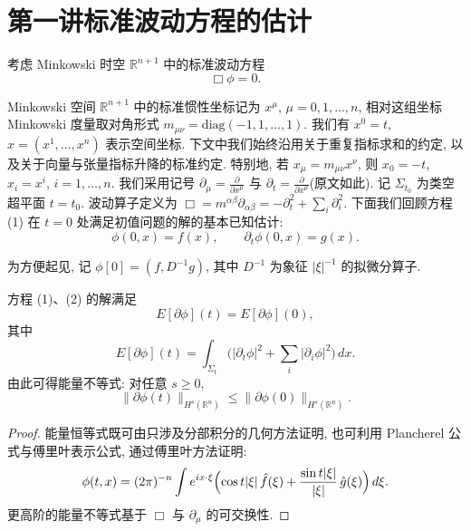 \chapter{第一讲\quad 标准波动方程的估计}

考虑 Minkowski 时空 $\mathbb{R}^{n+1}$ 中的标准波动方程
\begin{equation}
\Box\phi=0.\end{equation}

Minkowski 空间 $\mathbb{R}^{n+1}$ 中的标准惯性坐标记为 $x^\mu$, $\mu = 0,1,\ldots,n$, 相对这组坐标 Minkowski 度量取对角形式 $m_{\mu\nu}= \mathrm{diag}(-1,1,\ldots,1)$. 我们有 $x^0 = t$, $x = (x^1,\ldots,x^n)$ 表示空间坐标. 下文中我们始终沿用关于重复指标求和的约定, 以及关于向量与张量指标升降的标准约定. 特别地, 若 $x_\mu = m_{\mu\nu}x^\nu$, 则 $x_0 = -t$, $x_i = x^i$, $i = 1,\ldots,n$. 我们采用记号 $\partial_\mu = \frac{\partial}{\partial x^\mu}$ 与 $\partial_t = \frac{\partial}{\partial x^\mu}$(原文如此). 记 $\Sigma_{t_0}$ 为类空超平面 $t = t_0$. 波动算子定义为 $\Box = m^{\alpha\beta}\partial_{\alpha\beta} = -\partial_t^2 + \sum_i\partial_i^2$.
下面我们回顾方程 (1) 在 $t=0$ 处满足初值问题的解的基本已知估计:
\begin{equation}
\phi(0,x)=f(x),\qquad \partial_{t}\phi(0,x)=g(x).\end{equation}

为方便起见, 记 $\phi[0] = (f, D^{-1}g)$, 其中 $D^{-1}$ 为象征 $|\xi|^{-1}$ 的拟微分算子.
\begin{proposition}\label{prop:1.1}
方程 (1)、(2) 的解满足
\begin{equation}
E[\partial\phi](t)=E[\partial\phi](0),\end{equation}
其中
\begin{equation}
E[\partial\phi](t)=\int_{\Sigma_{t}}\bigl(|\partial_{t}\phi|^{2}+\sum_{i}|\partial_{i}\phi|^{2}\bigr)\,d x.\end{equation}
由此可得能量不等式: 对任意 $s \geq 0$,
\begin{equation}
\|\partial\phi(t)\|_{H^{s}(\mathbb{R}^{n})}\leq\|\partial\phi(0)\|_{H^{s}(\mathbb{R}^{n})}.\end{equation}
\end{proposition}

\begin{proof}
能量恒等式既可由只涉及分部积分的几何方法证明, 也可利用 Plancherel 公式与傅里叶表示公式, 通过傅里叶方法证明:
\begin{equation}
\phi(t,x)=(2\pi)^{-n}\int e^{i x\cdot\xi}\Bigl(\cos t|\xi|\,\hat f(\xi)+\frac{\sin t|\xi|}{|\xi|}\,\hat g(\xi)\Bigr)\,d\xi.\end{equation}
更高阶的能量不等式基于 $\Box$ 与 $\partial_{\mu}$ 的可交换性.\end{proof}

